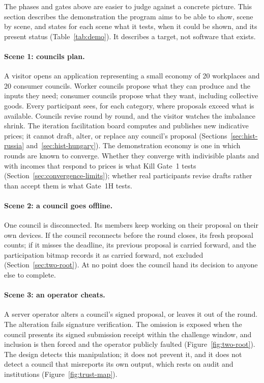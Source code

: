 \documentclass[10pt,twoside,openany]{book}
\theoremstyle{dpepstyle}
\begin{document}
The phases and gates above are easier to judge against a concrete picture. This section describes the demonstration the program aims to be able to show, scene by scene, and states for each scene what it tests, when it could be shown, and its present status (Table~\ref{tab:demo}). It describes a target, not software that exists.

\paragraph{Scene 1: councils plan.} A visitor opens an application representing a small economy of 20 workplaces and 20 consumer councils. Worker councils propose what they can produce and the inputs they need; consumer councils propose what they want, including collective goods. Every participant sees, for each category, where proposals exceed what is available. Councils revise round by round, and the visitor watches the imbalance shrink. The iteration facilitation board computes and publishes new indicative prices; it cannot draft, alter, or replace any council's proposal (Sections~\ref{sec:hist-russia} and~\ref{sec:hist-hungary}). The demonstration economy is one in which rounds are known to converge. Whether they converge with indivisible plants and with incomes that respond to prices is what Kill Gate~1 tests (Section~\ref{sec:convergence-limits}); whether real participants revise drafts rather than accept them is what Gate~1H tests.

\paragraph{Scene 2: a council goes offline.} One council is disconnected. Its members keep working on their proposal on their own devices. If the council reconnects before the round closes, its fresh proposal counts; if it misses the deadline, its previous proposal is carried forward, and the participation bitmap records it as carried forward, not excluded (Section~\ref{sec:two-root}). At no point does the council hand its decision to anyone else to complete.

\paragraph{Scene 3: an operator cheats.} A server operator alters a council's signed proposal, or leaves it out of the round. The alteration fails signature verification. The omission is exposed when the council presents its signed submission receipt within the challenge window, and inclusion is then forced and the operator publicly faulted (Figure~\ref{fig:two-root}). The design detects this manipulation; it does not prevent it, and it does not detect a council that misreports its own output, which rests on audit and institutions (Figure~\ref{fig:trust-map}).
\end{document}
